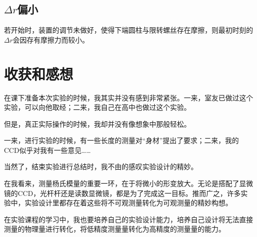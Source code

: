 \documentclass{ctexart}
\begin{document}
\subsection{$\Delta r$偏小}若开始时，装置的调节未做好，使得下端圆柱与限转螺丝存在摩擦，则最初时刻的$\Delta r$会因存有摩擦力而较小。
\section{收获和感想}

在课下准备本次实验的时候，我其实并没有感到非常紧张。一来，室友已做过这个实验，可以向他取经；二来，我自己在高中也做过这个实验。

但是，真正实际操作的时候，我却并没有像想象中那般轻松。

一来，进行实验的时候，有一些长度的测量对“身材”提出了要求；二来，我的CCD似乎对我有一些意见……

当然了，结束实验进行总结时，我不由的感叹实验设计的精妙。

在我看来，测量杨氏模量的重要一环，在于将微小的形变放大。无论是搭配了显微镜的CCD，光杆杆还是读数显微镜，都是为了完成这一目标。推而广之，许多实验中，实验设计里都存在着这些将不可观测量转化为可观测量的精妙构想。

在实验课程的学习中，我也要培养自己的实验设计能力，培养自己设计将无法直接测量的物理量进行转化，将低精度测量量转化为高精度的测量量的能力。
    
\end{document}
